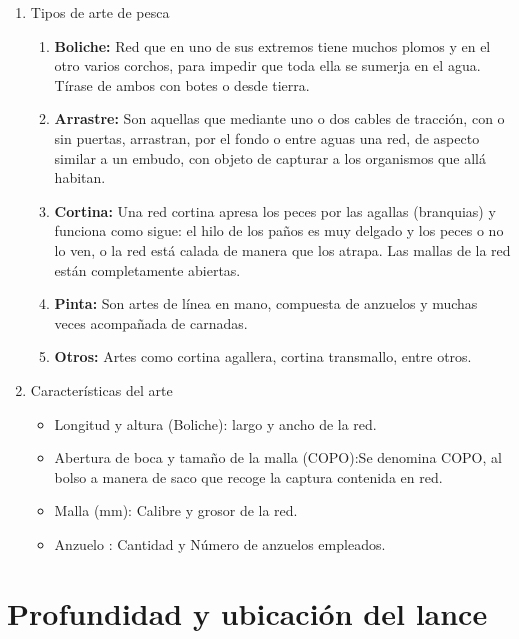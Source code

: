 \documentclass[a4paper,oneside,11pt]{book}
\begin{document}
\begin{enumerate}
\item Tipos de arte de pesca
\begin{enumerate}
\item \textbf{Boliche:} Red que en uno de sus extremos tiene muchos plomos y en el otro varios corchos, para impedir que toda ella se sumerja en el agua. Tírase de ambos con botes o desde tierra.
\item \textbf{Arrastre:} Son aquellas que mediante uno o dos cables de tracción, con o sin puertas, arrastran, por el fondo o entre aguas una red, de aspecto similar a un embudo, con objeto de capturar a los organismos que allá habitan.
\item \textbf{Cortina:} Una red cortina apresa los peces por las agallas (branquias) y funciona como sigue: el hilo de los paños es muy delgado y los peces o no lo ven, o la red está calada de manera que los atrapa. Las mallas de la red están completamente abiertas. 

\item \textbf{Pinta:} Son artes de línea en mano, compuesta de anzuelos y muchas veces acompañada de carnadas.
\item \textbf{Otros:} Artes como cortina agallera, cortina transmallo, entre otros.
\end{enumerate}
\item Características del arte
\begin{itemize}
\item Longitud y altura (Boliche): largo y ancho de la red.
\item Abertura de boca y tamaño de la malla (COPO):Se denomina COPO, al bolso a manera de saco que recoge la captura contenida en red.
\item Malla (mm): Calibre y grosor de la red.
\item Anzuelo : Cantidad y Número de anzuelos empleados.
\end{itemize}
\end{enumerate}

\section{Profundidad y ubicación del lance}


 \begin{figure} [!h]
  \begin{center}
   \end{center}
   \end{figure}
  
\end{document}
